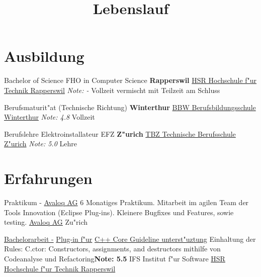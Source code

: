 \documentclass[11pt,legalpaper,sans]{moderncv}
\title{Lebenslauf}
\begin{document}
\makecvtitle

\section{Ausbildung}
{Bachelor of Science FHO in Computer Science}
{\hfill\bfseries Rapperswil}
{\newline{}\href{http://www.hsr.ch/}{HSR Hochschule f"ur Technik Rapperswil}}
{\hfill\textit{Note: -}}
{Vollzeit vermischt mit Teilzeit am Schluss}

{Berufsmaturit"at (Technische Richtung)}
{\hfill\bfseries Winterthur}
{\newline{}\href{http://www.bbw.ch/}{BBW Berufsbildungsschule Winterthur}}
{\hfill\textit{Note: 4.8}}
{Vollzeit}

{Berufslehre Elektroinstallateur EFZ}
{\hfill\bfseries Z"urich}
{\newline{}\href{htttp://www.tbz.ch/}{TBZ Technische Berufsschule Z"urich}}
{\hfill\textit{Note: 5.0}}
{Lehre}

\section{Erfahrungen}
{Praktikum - \href{https://www.avaloq.ch/}{Avaloq AG}}{}
{\newline{}6 Monatiges Praktikum. Mitarbeit im  agilen Team der Tools Innovation (Eclipse Plug-ins). Kleinere Bugfixes und Features, sowie testing.}{}
{\href{https://www.avaloq.ch/}{Avaloq AG} \hfill Zu"rich}

{\href{http://sinv-56012.edu.hsr.ch/ccglator}{Bachelorarbeit -} \href{https://www.youtube.com/watch?v=CeNdN5KlPGc}{Plug-in f"ur} \href{https://github.com/isocpp/CppCoreGuidelines/blob/master/CppCoreGuidelines.md}{C++ Core Guideline unterst"uztung}}{}
{\newline{}Einhaltung der Rules: C.ctor: Constructors, assignments, and destructors mithilfe von Codeanalyse und Refactoring}{\hfill \textbf{Note: 5.5}}
{IFS Institut f"ur Software \hfill\href{http://www.hsr.ch/}{HSR Hochschule f"ur Technik Rapperswil}}
\end{document}
